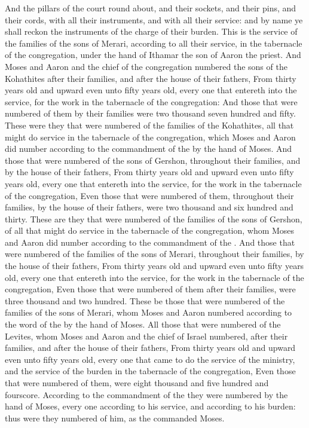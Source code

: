 \begin{biblechapter}
\verse And the pillars of the court round about, and their sockets, and their pins, and their cords, with all their instruments, and with all their service: and by name ye shall reckon the instruments of the charge of their burden.
\verse This is the service of the families of the sons of Merari, according to all their service, in the tabernacle of the congregation, under the hand of Ithamar the son of Aaron the priest.
 And Moses and Aaron and the chief of the congregation numbered the sons of the Kohathites after their families, and after the house of their fathers,
\verse From thirty years old and upward even unto fifty years old, every one that entereth into the service, for the work in the tabernacle of the congregation:
\verse And those that were numbered of them by their families were two thousand seven hundred and fifty.
\verse These were they that were numbered of the families of the Kohathites, all that might do service in the tabernacle of the congregation, which Moses and Aaron did number according to the commandment of the \LORD by the hand of Moses.
\verse And those that were numbered of the sons of Gershon, throughout their families, and by the house of their fathers,
\verse From thirty years old and upward even unto fifty years old, every one that entereth into the service, for the work in the tabernacle of the congregation,
\verse Even those that were numbered of them, throughout their families, by the house of their fathers, were two thousand and six hundred and thirty.
\verse These are they that were numbered of the families of the sons of Gershon, of all that might do service in the tabernacle of the congregation, whom Moses and Aaron did number according to the commandment of the \LORD.
\verse And those that were numbered of the families of the sons of Merari, throughout their families, by the house of their fathers,
\verse From thirty years old and upward even unto fifty years old, every one that entereth into the service, for the work in the tabernacle of the congregation,
\verse Even those that were numbered of them after their families, were three thousand and two hundred.
\verse These be those that were numbered of the families of the sons of Merari, whom Moses and Aaron numbered according to the word of the \LORD by the hand of Moses.
\verse All those that were numbered of the Levites, whom Moses and Aaron and the chief of Israel numbered, after their families, and after the house of their fathers,
\verse From thirty years old and upward even unto fifty years old, every one that came to do the service of the ministry, and the service of the burden in the tabernacle of the congregation,
\verse Even those that were numbered of them, were eight thousand and five hundred and fourscore.
\verse According to the commandment of the \LORD they were numbered by the hand of Moses, every one according to his service, and according to his burden: thus were they numbered of him, as the \LORD commanded Moses.
\end{biblechapter}

